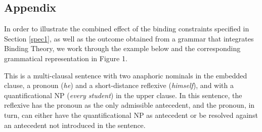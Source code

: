 \documentclass[output=paper
	        ,collection
	        ,collectionchapter
 	        ,biblatex
                ,babelshorthands
                ,newtxmath
                ,draftmode
                ,colorlinks, citecolor=brown
]{langscibook}
\begin{document}
\begin{paperappendix}
\section*{Appendix \label{verif}}
\setcounter{section}{1}


In order to illustrate the combined effect of the binding constraints specified in Section \ref{spec1}, 
as well as the outcome obtained from a grammar that integrates Binding Theory,
we work through the example below and the corresponding grammatical
representation in Figure 1. %
%



\begin{exe}
\end{exe}

This is a
multi-clausal sentence with two anaphoric nominals in the embedded
clause, a pronoun ({\em he}) and a short-distance reflexive ({\em himself}), and with a quantificational
NP ({\em every student}) in the upper clause. In this sentence,
the reflexive has the pronoun as the only admissible antecedent,
and the pronoun, in turn, can either have the quantificational
NP as antecedent or be resolved against an antecedent not 
introduced in the sentence.


\end{paperappendix}
\end{document}
